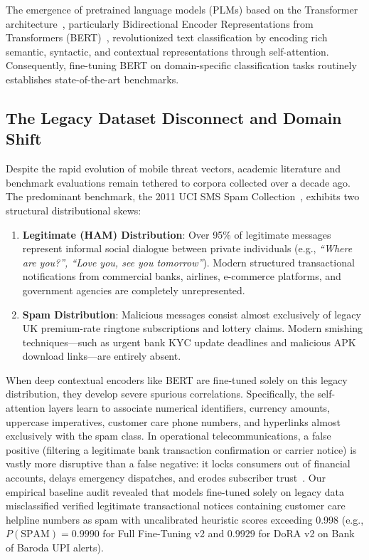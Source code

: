 \documentclass[conference]{IEEEtran}
\begin{document}
The emergence of pretrained language models (PLMs) based on the Transformer architecture~\cite{vaswani2017attention}, particularly Bidirectional Encoder Representations from Transformers (BERT)~\cite{devlin2019bert}, revolutionized text classification by encoding rich semantic, syntactic, and contextual representations through self-attention. Consequently, fine-tuning BERT on domain-specific classification tasks routinely establishes state-of-the-art benchmarks.

\subsection{The Legacy Dataset Disconnect and Domain Shift}
Despite the rapid evolution of mobile threat vectors, academic literature and benchmark evaluations remain tethered to corpora collected over a decade ago. The predominant benchmark, the 2011 UCI SMS Spam Collection~\cite{almeida2011sms}, exhibits two structural distributional skews:
\begin{enumerate}
    \item \textbf{Legitimate (HAM) Distribution}: Over 95\% of legitimate messages represent informal social dialogue between private individuals (e.g., \textit{``Where are you?'', ``Love you, see you tomorrow''}). Modern structured transactional notifications from commercial banks, airlines, e-commerce platforms, and government agencies are completely unrepresented.
    \item \textbf{Spam Distribution}: Malicious messages consist almost exclusively of legacy UK premium-rate ringtone subscriptions and lottery claims. Modern smishing techniques---such as urgent bank KYC update deadlines and malicious APK download links---are entirely absent.
\end{enumerate}

When deep contextual encoders like BERT are fine-tuned solely on this legacy distribution, they develop severe spurious correlations. Specifically, the self-attention layers learn to associate numerical identifiers, currency amounts, uppercase imperatives, customer care phone numbers, and hyperlinks almost exclusively with the spam class. In operational telecommunications, a false positive (filtering a legitimate bank transaction confirmation or carrier notice) is vastly more disruptive than a false negative: it locks consumers out of financial accounts, delays emergency dispatches, and erodes subscriber trust~\cite{delany2012sms}. Our empirical baseline audit revealed that models fine-tuned solely on legacy data misclassified verified legitimate transactional notices containing customer care helpline numbers as spam with uncalibrated heuristic scores exceeding 0.998 (e.g., $P(\text{SPAM}) = 0.9990$ for Full Fine-Tuning v2 and $0.9929$ for DoRA v2 on Bank of Baroda UPI alerts).
\end{document}
